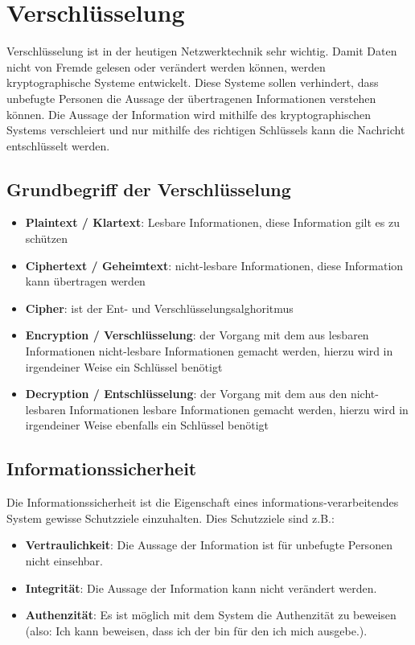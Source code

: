 \chapter{Verschlüsselung}

Verschlüsselung ist in der heutigen Netzwerktechnik sehr wichtig. Damit Daten nicht von Fremde gelesen oder verändert werden können, werden kryptographische Systeme entwickelt. Diese Systeme sollen verhindert, dass unbefugte Personen die Aussage der übertragenen Informationen verstehen können. Die Aussage der Information wird mithilfe des kryptographischen Systems verschleiert und nur mithilfe des richtigen Schlüssels kann die Nachricht entschlüsselt werden.\\

\section{Grundbegriff der Verschlüsselung}

\begin{itemize}
\item \textbf{Plaintext / Klartext}: Lesbare Informationen, diese Information gilt es zu schützen
\item \textbf{Ciphertext / Geheimtext}: nicht-lesbare Informationen, diese Information kann übertragen werden
\item \textbf{Cipher}: ist der Ent- und Verschlüsselungsalghoritmus
\item \textbf{Encryption / Verschlüsselung}: der Vorgang mit dem aus lesbaren Informationen nicht-lesbare Informationen gemacht werden, hierzu wird in irgendeiner Weise ein Schlüssel benötigt
\item \textbf{Decryption / Entschlüsselung}: der Vorgang mit dem aus den nicht-lesbaren Informationen lesbare Informationen gemacht werden, hierzu wird in irgendeiner Weise ebenfalls ein Schlüssel benötigt
\end{itemize}

\section{Informationssicherheit}

Die Informationssicherheit ist die Eigenschaft eines informations-verarbeitendes System gewisse Schutzziele einzuhalten. Dies Schutzziele sind z.B.:

\begin{itemize}
\item \textbf{Vertraulichkeit}: Die Aussage der Information ist für unbefugte Personen nicht einsehbar.
\item \textbf{Integrität}: Die Aussage der Information kann nicht verändert werden.
\item \textbf{Authenzität}: Es ist möglich mit dem System die Authenzität zu beweisen (also: Ich kann beweisen, dass ich der bin für den ich mich ausgebe.).
\end{itemize}

